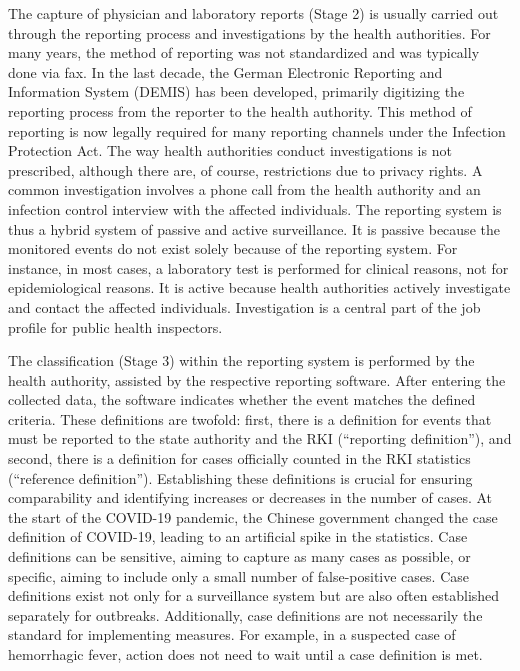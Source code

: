 \documentclass[
  letterpaper,
  DIV=11,
  numbers=noendperiod]{scrreprt}
\begin{document}
The capture of physician and laboratory reports (Stage 2) is usually
carried out through the reporting process and investigations by the
health authorities. For many years, the method of reporting was not
standardized and was typically done via fax. In the last decade, the
German Electronic Reporting and Information System (DEMIS) has been
developed, primarily digitizing the reporting process from the reporter
to the health authority. This method of reporting is now legally
required for many reporting channels under the Infection Protection Act.
The way health authorities conduct investigations is not prescribed,
although there are, of course, restrictions due to privacy rights. A
common investigation involves a phone call from the health authority and
an infection control interview with the affected individuals. The
reporting system is thus a hybrid system of passive and active
surveillance. It is passive because the monitored events do not exist
solely because of the reporting system. For instance, in most cases, a
laboratory test is performed for clinical reasons, not for
epidemiological reasons. It is active because health authorities
actively investigate and contact the affected individuals. Investigation
is a central part of the job profile for public health inspectors.

The classification (Stage 3) within the reporting system is performed by
the health authority, assisted by the respective reporting software.
After entering the collected data, the software indicates whether the
event matches the defined criteria. These definitions are twofold:
first, there is a definition for events that must be reported to the
state authority and the RKI (``reporting definition''), and second,
there is a definition for cases officially counted in the RKI statistics
(``reference definition''). Establishing these definitions is crucial
for ensuring comparability and identifying increases or decreases in the
number of cases. At the start of the COVID-19 pandemic, the Chinese
government changed the case definition of COVID-19, leading to an
artificial spike in the statistics. Case definitions can be sensitive,
aiming to capture as many cases as possible, or specific, aiming to
include only a small number of false-positive cases. Case definitions
exist not only for a surveillance system but are also often established
separately for outbreaks. Additionally, case definitions are not
necessarily the standard for implementing measures. For example, in a
suspected case of hemorrhagic fever, action does not need to wait until
a case definition is met.
\end{document}
